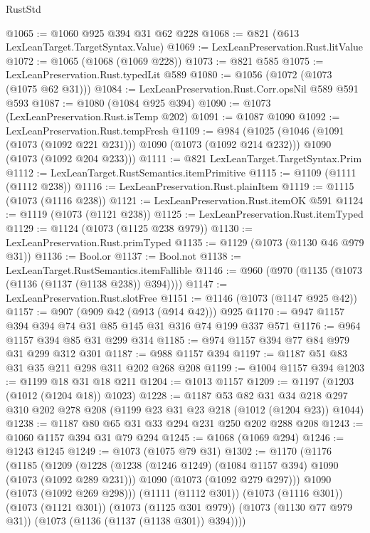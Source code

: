\begin{lexlean}{RustStd}
\begin{coremodule}
@1065 := @1060 @925 @394 @31 @62 @228
@1068 := @821 (@613 LexLeanTarget.TargetSyntax.Value)
@1069 := LexLeanPreservation.Rust.litValue
@1072 := @1065 (@1068 (@1069 @228))
@1073 := @821 @585
@1075 := LexLeanPreservation.Rust.typedLit @589
@1080 := @1056 (@1072 (@1073 (@1075 @62 @31)))
@1084 := LexLeanPreservation.Rust.Corr.opsNil @589 @591 @593
@1087 := @1080 (@1084 @925 @394)
@1090 := @1073 (LexLeanPreservation.Rust.isTemp @202)
@1091 := @1087 @1090
@1092 := LexLeanPreservation.Rust.tempFresh
@1109 := @984
    (@1025
      (@1046 (@1091 (@1073 (@1092 @221 @231))) @1090 (@1073 (@1092 @214 @232)))
      @1090
      (@1073 (@1092 @204 @233)))
@1111 := @821 LexLeanTarget.TargetSyntax.Prim
@1112 := LexLeanTarget.RustSemantics.itemPrimitive
@1115 := @1109 (@1111 (@1112 @238))
@1116 := LexLeanPreservation.Rust.plainItem
@1119 := @1115 (@1073 (@1116 @238))
@1121 := LexLeanPreservation.Rust.itemOK @591
@1124 := @1119 (@1073 (@1121 @238))
@1125 := LexLeanPreservation.Rust.itemTyped
@1129 := @1124 (@1073 (@1125 @238 @979))
@1130 := LexLeanPreservation.Rust.primTyped
@1135 := @1129 (@1073 (@1130 @46 @979 @31))
@1136 := Bool.or
@1137 := Bool.not
@1138 := LexLeanTarget.RustSemantics.itemFallible
@1146 := @960 (@970 (@1135 (@1073 (@1136 (@1137 (@1138 @238)) @394))))
@1147 := LexLeanPreservation.Rust.slotFree
@1151 := @1146 (@1073 (@1147 @925 @42))
@1157 := @907 (@909 @42 (@913 (@914 @42))) @925
@1170 := @947 @1157 @394 @394 @74 @31 @85 @145 @31 @316 @74 @199 @337 @571
@1176 := @964 @1157 @394 @85 @31 @299 @314
@1185 := @974 @1157 @394 @77 @84 @979 @31 @299 @312 @301
@1187 := @988 @1157 @394
@1197 := @1187 @51 @83 @31 @35 @211 @298 @311 @202 @268 @208
@1199 := @1004 @1157 @394
@1203 := @1199 @18 @31 @18 @211
@1204 := @1013 @1157
@1209 := @1197 (@1203 (@1012 (@1204 @18)) @1023)
@1228 := @1187
    @53
    @82
    @31
    @34
    @218
    @297
    @310
    @202
    @278
    @208
    (@1199 @23 @31 @23 @218 (@1012 (@1204 @23)) @1044)
@1238 := @1187 @80 @65 @31 @33 @294 @231 @250 @202 @288 @208
@1243 := @1060 @1157 @394 @31 @79 @294
@1245 := @1068 (@1069 @294)
@1246 := @1243 @1245
@1249 := @1073 (@1075 @79 @31)
@1302 := @1170
    (@1176
      (@1185
        (@1209
          (@1228
            (@1238 (@1246 @1249) (@1084 @1157 @394) @1090 (@1073 (@1092 @289 @231)))
            @1090
            (@1073 (@1092 @279 @297)))
          @1090
          (@1073 (@1092 @269 @298)))
        (@1111 (@1112 @301))
        (@1073 (@1116 @301))
        (@1073 (@1121 @301))
        (@1073 (@1125 @301 @979))
        (@1073 (@1130 @77 @979 @31))
        (@1073 (@1136 (@1137 (@1138 @301)) @394))))

\end{coremodule}
\end{lexlean}
